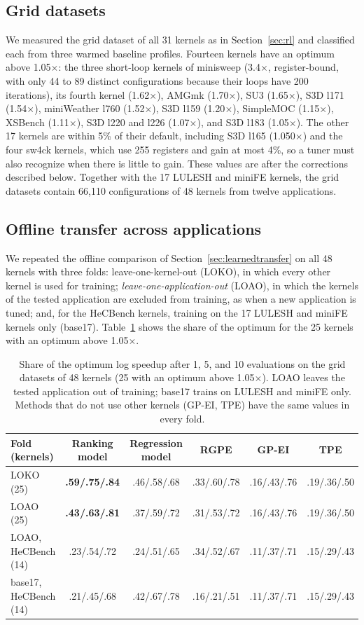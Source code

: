 \documentclass[10pt]{article}
\newcommand{\x}{\ensuremath{\times}}
\begin{document}
\subsection{Grid datasets}
We measured the grid dataset of all 31 kernels as in
Section~\ref{sec:rl} and classified each from three warmed baseline profiles.
Fourteen kernels have an optimum above 1.05\x{}: the three short-loop kernels
of minisweep (3.4\x{}, register-bound, with only 44 to 89 distinct
configurations because their loops have 200 iterations), its fourth kernel
(1.62\x{}), AMGmk (1.70\x{}), SU3 (1.65\x{}), S3D l171 (1.54\x{}), miniWeather
l760 (1.52\x{}), S3D l159 (1.20\x{}), SimpleMOC (1.15\x{}), XSBench (1.11\x{}),
S3D l220 and l226 (1.07\x{}), and S3D l183 (1.05\x{}). The other 17 kernels are
within 5\% of their default, including S3D l165 (1.050\x{}) and the four sw4ck
kernels, which use 255 registers and gain at most 4\%, so a tuner must also
recognize when there is little to gain. These values are
after the corrections described below. Together with the 17 LULESH and miniFE kernels, the
grid datasets contain 66{,}110 configurations of 48 kernels from twelve
applications.

\subsection{Offline transfer across applications}
We repeated the offline comparison of Section~\ref{sec:learnedtransfer} on all
48 kernels with three folds: leave-one-kernel-out (LOKO), in which every other
kernel is used for training; \emph{leave-one-application-out} (LOAO), in which
the kernels of the tested application are excluded from training, as when a
new application is tuned; and, for the HeCBench kernels, training on the 17
LULESH and miniFE kernels only (base17). Table~\ref{tab:hecoffline} shows the
share of the optimum for the 25 kernels with an optimum above 1.05\x{}.

\begin{table}[t]
\centering
\caption{Share of the optimum log speedup after 1, 5, and 10 evaluations on
the grid datasets of 48 kernels (25 with an optimum above 1.05\x{}). LOAO leaves
the tested application out of training; base17 trains on LULESH and miniFE
only. Methods that do not use other kernels (GP-EI, TPE) have the same values
in every fold.}
\label{tab:hecoffline}
\small
\setlength{\tabcolsep}{3.5pt}
\begin{tabular}{lccccc}
\toprule
Fold (kernels) & Ranking model & Regression model & RGPE & GP-EI & TPE \\
\midrule
LOKO (25) & \textbf{.59/.75/.84} & .46/.58/.68 & .33/.60/.78 & .16/.43/.76 & .19/.36/.50 \\
LOAO (25) & \textbf{.43/.63/.81} & .37/.59/.72 & .31/.53/.72 & .16/.43/.76 & .19/.36/.50 \\
LOAO, HeCBench (14) & .23/.54/.72 & .24/.51/.65 & .34/.52/.67 & .11/.37/.71 & .15/.29/.43 \\
base17, HeCBench (14) & .21/.45/.68 & .42/.67/.78 & .16/.21/.51 & .11/.37/.71 & .15/.29/.43 \\
\bottomrule
\end{tabular}
\end{table}
\end{document}
